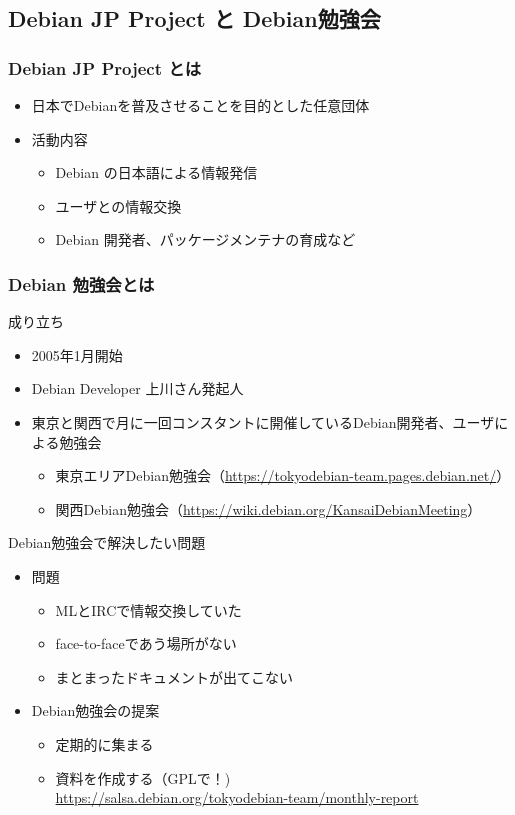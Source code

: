 \documentclass[mingoth,a4paper]{jsarticle}
\begin{document}
\subsection{Debian JP Project と Debian勉強会}

\subsubsection{Debian JP Project とは}

\begin{itemize}
  \item 日本でDebianを普及させることを目的とした任意団体
  \item 活動内容
  \begin{itemize}
    \item Debian の日本語による情報発信
    \item ユーザとの情報交換
    \item Debian 開発者、パッケージメンテナの育成など
  \end{itemize}
\end{itemize}


\subsubsection{Debian 勉強会とは}

成り立ち
\begin{itemize}
 \item 2005年1月開始
 \item Debian Developer 上川さん発起人
 \item 東京と関西で月に一回コンスタントに開催しているDebian開発者、ユーザによる勉強会
   \begin{itemize}
   \item 東京エリアDebian勉強会（\url{https://tokyodebian-team.pages.debian.net/}）
   \item 関西Debian勉強会（\url{https://wiki.debian.org/KansaiDebianMeeting}）
   \end{itemize}
\end{itemize}

Debian勉強会で解決したい問題
\begin{itemize}
  \item 問題
  \begin{itemize}
  \item MLとIRCで情報交換していた
  \item face-to-faceであう場所がない
  \item まとまったドキュメントが出てこない
  \end{itemize}
\item Debian勉強会の提案
  \begin{itemize}
  \item 定期的に集まる
  \item 資料を作成する（GPLで！) \\
	{\small \url{https://salsa.debian.org/tokyodebian-team/monthly-report}}
  \end{itemize}
\end{itemize}
\end{document}
